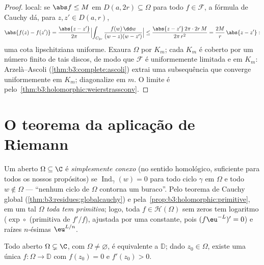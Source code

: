 \begin{proof}
 local: se $\abs f \leq M$ em $D(a, 2r)
\subseteq \Omega$ para todo $f \in \mathcal F$, a fórmula de
Cauchy dá, para $z, z' \in D(a, r)$,
\[
\abs{f(z) - f(z')} = \frac{\abs{z - z'}}{2\pi}
\Bigl|\int_{C_{2r}}\frac{f(w)\,\dd w}{(w-z)(w-z')}\Bigr|
\leq \frac{\abs{z - z'}\,2\pi\cdot2r\,M}{2\pi\,r^2}
= \frac{2M}{r}\,\abs{z - z'} :
\]
uma cota lipschitziana uniforme. Exaura $\Omega$ por 
$K_m$; cada $K_m$ é coberto por um número finito de tais discos,
de modo que $\mathcal F$ é uniformemente limitada e  em $K_m$:
Arzelà--Ascoli (\cref{thm:b3:complete:ascoli}) extrai uma subsequência que converge
uniformemente em $K_m$; diagonalize em $m$. O limite é 
pelo~\cref{thm:b3:holomorphic:weierstrassconv}.
\end{proof}

\section{O teorema da aplicação de Riemann}

\begin{definition}\label{def:b3:conformal:simplyconnected}
Um aberto  $\Omega \subseteq \C$ é \emph{simplesmente conexo} (no sentido homológico, suficiente para todos os
nossos propósitos) se $\operatorname{Ind}_\gamma(w) = 0$ para todo ciclo $\gamma$ em $\Omega$
e todo $w \notin \Omega$ --- ``nenhum ciclo de $\Omega$ contorna um buraco''.
Pelo teorema de Cauchy global (\cref{thm:b3:residues:globalcauchy}) e pela~\cref{prop:b3:holomorphic:primitive},
em um tal $\Omega$ \emph{toda  tem primitiva}; logo,
toda $f \in \mathcal H(\Omega)$ sem zeros tem logaritmo  ($\exp\circ$ (primitiva de
$f'/f$), ajustada por uma constante, pois $(f\eu^{-L})' = 0$) e raízes
$n$-ésimas  $\eu^{L/n}$.
\end{definition}

\begin{theorem}
\label{thm:b3:conformal:rmt}
Todo aberto  $\Omega \subsetneq \C$, com $\Omega
\neq \varnothing$, é 
equivalente a $\mathbb D$; dado $z_0 \in \Omega$, existe uma única 
$f \colon
\Omega \to \mathbb D$ com $f(z_0) = 0$ e $f'(z_0) >
0$.
\end{theorem}

